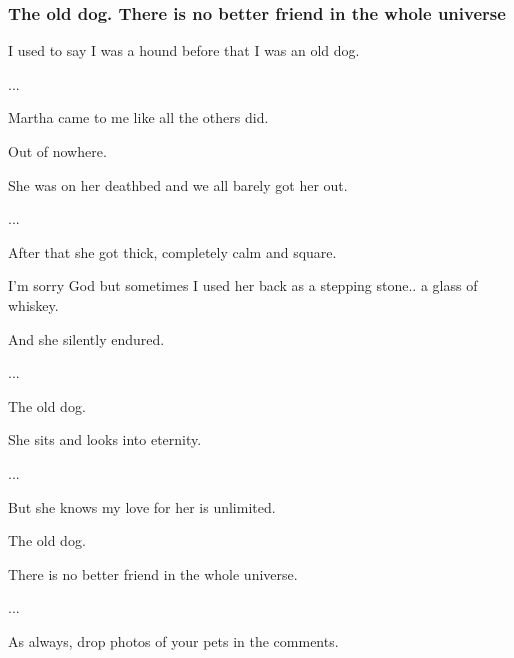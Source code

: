  
 
 
 
 

\subsubsection{The old dog. There is no better friend in the whole universe}

I used to say I was a hound before that I was an old dog.\par
...\par
Martha came to me like all the others did.\par
Out of nowhere.\par
She was on her deathbed and we all barely got her out.\par
...\par
After that she got thick, completely calm and square.\par
I'm sorry God but sometimes I used her back as a stepping stone.. a glass of whiskey.\par
And she silently endured.\par
...\par
The old dog.\par
She sits and looks into eternity.\par
...\par
But she knows my love for her is unlimited.\par
The old dog.\par
There is no better friend in the whole universe.\par
...\par
As always, drop photos of your pets in the comments.\par
